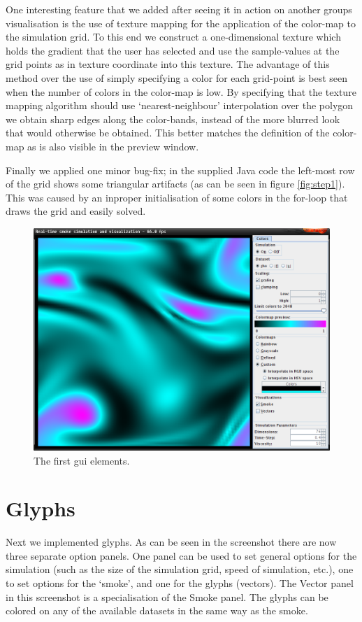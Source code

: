 \documentclass[a4paper,11pt,twoside]{report}
\begin{document}
		One interesting feature that we added after seeing it in action on another groups visualisation is the use of texture mapping for the application of the color-map to the simulation grid. To this end we construct a one-dimensional texture which holds the gradient that the user has selected and use the sample-values at the grid points as in texture coordinate into this texture. The advantage of this method over the use of simply specifying a color for each grid-point is best seen when the number of colors in the color-map is low. By specifying that the texture mapping algorithm should use `nearest-neighbour' interpolation over the polygon we obtain sharp edges along the color-bands, instead of the more blurred look that would otherwise be obtained. This better matches the definition of the color-map as is also visible in the preview window.

		Finally we applied one minor bug-fix; in the supplied Java code the left-most row of the grid shows some triangular artifacts (as can be seen in figure \ref{fig:step1}). This was caused by an inproper initialisation of some colors in the for-loop that draws the grid and easily solved.
		\begin{figure}[h]
		\centering
		\includegraphics[scale=\imagescalefactor]{images/step2.png}
		\caption{The first gui elements.}\label{fig:step2}
		\end{figure}
		\clearpage
	\section{Glyphs}
		Next we implemented glyphs. As can be seen in the screenshot there are now three separate option panels. One panel can be used to set general options for the simulation (such as the size of the simulation grid, speed of simulation, etc.), one to set options for the `smoke', and one for the glyphs (vectors). The Vector panel in this screenshot is a specialisation of the Smoke panel. The glyphs can be colored on any of the available datasets in the same way as the smoke.
\end{document}
